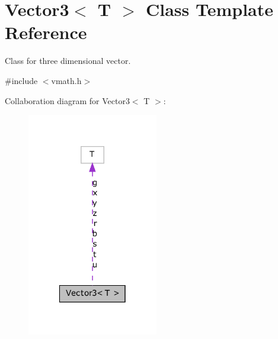 \hypertarget{class_vector3}{
\section{Vector3$<$ T $>$ Class Template Reference}
\label{class_vector3}
}


Class for three dimensional vector.  




{\ttfamily \#include $<$vmath.h$>$}



Collaboration diagram for Vector3$<$ T $>$:
\nopagebreak
\begin{figure}[H]
\begin{center}
\leavevmode
\includegraphics[width=162pt]{class_vector3__coll__graph}
\end{center}
\end{figure}

